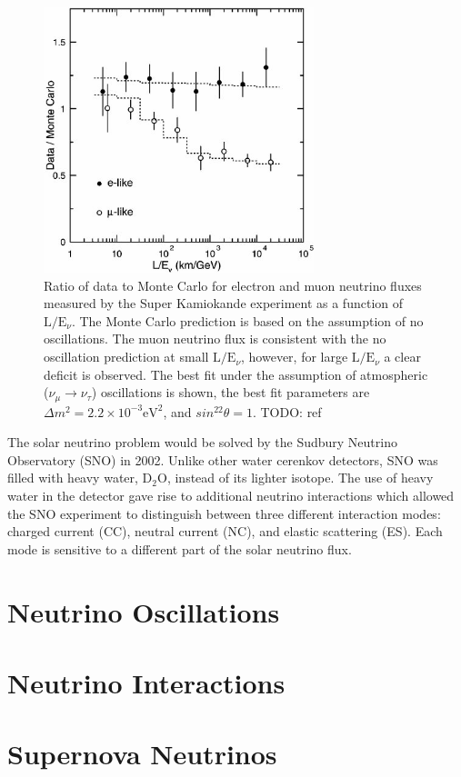 \begin{figure}
	\centering
	\includegraphics[width=0.7\textwidth]{figures/sk_flux.jpg}
	\caption{Ratio of data to Monte Carlo for electron and muon neutrino fluxes 
	measured by the Super Kamiokande experiment as a function of 
	\(\mbox{L} / \mbox{E}_\nu\). The Monte Carlo prediction is based on the
	assumption of no oscillations. The muon neutrino flux is consistent with the
	no oscillation prediction at small \(\mbox{L} / \mbox{E}_\nu\), however, for
	large \(\mbox{L} / \mbox{E}_\nu\) a clear deficit is observed. The best fit
	under the assumption of atmospheric (\(\nu_\mu \rightarrow \nu_\tau\))
	oscillations is shown, the best fit parameters are \(\Delta m^2 = 2.2 \times
	10^{-3} \mbox{eV}^2\), and \(sin^22\theta = 1\). TODO: ref}
	\label{fig:sk_flux}
\end{figure}

The solar neutrino problem would be solved by the Sudbury Neutrino Observatory
(SNO) in 2002. Unlike other water cerenkov detectors, SNO was filled with heavy
water, \(\mbox{D}_2\mbox{O}\), instead of its lighter isotope. The use of heavy
water in the detector gave rise to additional neutrino interactions which
allowed the SNO experiment to distinguish between three different interaction
modes: charged current (CC), neutral current (NC), and elastic scattering (ES).
Each mode is sensitive to a different part of the solar neutrino flux.




\section{Neutrino Oscillations} \label{nu_osc}

\section{Neutrino Interactions} \label{nu_prod}

\section{Supernova Neutrinos} \label{nu_sn}
